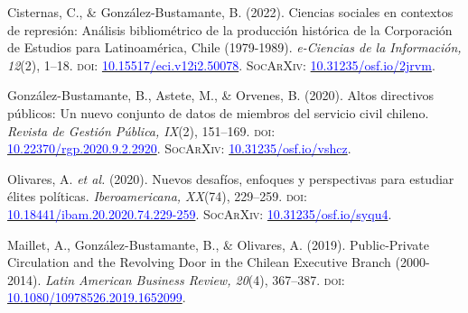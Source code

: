 \begin{publications}

\begin{benumerate}{9}

\item{\small Cisternas, C., \& González-Bustamante, B. (2022). Ciencias sociales en contextos de represión: Análisis bibliométrico de la producción histórica de la Corporación de Estudios para Latinoamérica, Chile (1979-1989). {\itshape e-Ciencias de la Información, 12}(2), 1--18. {\scshape doi:} \href{https://doi.org/10.15517/eci.v12i2.50078}{\textcolor{blue}{10.15517/eci.v12i2.50078}}. {\scshape \footnotesize SocArXiv:} \href{https://doi.org/10.31235/osf.io/2jrvm}{\textcolor{blue}{10.31235/osf.io/2jrvm}}.}\vspace{1mm} %

\item{\small González-Bustamante, B., Astete, M., \& Orvenes, B. (2020). Altos directivos públicos: Un nuevo conjunto de datos de miembros del servicio civil chileno. {\itshape Revista de Gestión Pública, IX}(2), 151--169. {\scshape doi}: \\ \href{https://doi.org/10.22370/rgp.2020.9.2.2920}{\textcolor{blue}{10.22370/rgp.2020.9.2.2920}}. {\scshape \footnotesize SocArXiv:} \href{https://doi.org/10.31235/osf.io/vshcz}{\textcolor{blue}{10.31235/osf.io/vshcz}}.}\vspace{1mm}

\item{\small Olivares, A. {\itshape et al.} (2020). Nuevos desafíos, enfoques y perspectivas para estudiar élites políticas. {\itshape Iberoamericana, XX}(74), 229--259. {\scshape doi}: \href{https://doi.org/10.18441/ibam.20.2020.74.229-259}{\textcolor{blue}{10.18441/ibam.20.2020.74.229-259}}. {\scshape \footnotesize SocArXiv:} \href{https://doi.org/10.31235/osf.io/syqu4}{\textcolor{blue}{10.31235/osf.io/syqu4}}.}\vspace{1mm}

\item{\small Maillet, A., González-Bustamante, B., \& Olivares, A. (2019). Public-Private Circulation and the Revolving Door in the Chilean Executive Branch (2000-2014). {\itshape Latin American Business Review, 20}(4), 367--387. {\scshape doi}: \\ \href{https://doi.org/10.1080/10978526.2019.1652099}{\textcolor{blue}{10.1080/10978526.2019.1652099}}.}\vspace{1mm}


\end{benumerate}
\end{publications}
